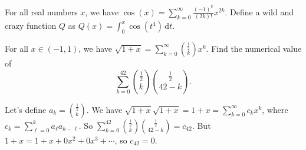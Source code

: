 \documentclass[fleqn,answers,12pt]{exam}
\begin{document}
\begin{questions}
\begin{parts}
\end{parts}

\question For all real numbers $x$, we have
$\displaystyle
   \cos(x) = \sum_{k=0}^\infty \frac{(-1)^k}{(2k)!} x^{2 k}.
$
Define a wild and crazy function ${Q}$ as  ${Q(x)} = \int_0^x \cos \left(t^4 \right)  \, \mathrm{d} t.$


\question [1] For all $x \in (-1,1)$, we have $\displaystyle \sqrt{1+x} = \sum_{k=0}^\infty \binom{\frac{1}{2}} {k} x^k$. Find the numerical value of
\begin{equation*} 
   \sum_{k = 0}^{42} \binom{\frac{1}{2}} {k} \binom{\frac{1}{2}} {42-k}.
\end{equation*}
   
   \begin{solution}  Let's define $a_k = \binom{\frac{1}{2}} {k}$. We have
   $\sqrt{1+x} \sqrt{1+x} = 1 + x = \sum_{k=0}^\infty c_k x^k$, where $c_k = \sum_{\ell = 0}^k a_\ell a_{k-\ell}$.
   So $\sum_{k = 0}^{42} \binom{\frac{1}{2}} {k} \binom{\frac{1}{2}} {42-k} = c_{42}$.  But $1 + x = 1 + x + 0 x^2 + 0 x^3 + \cdots$, so $c_{42} = 0$.
   
   \end{solution}
  
\end{questions}
\end{document}
